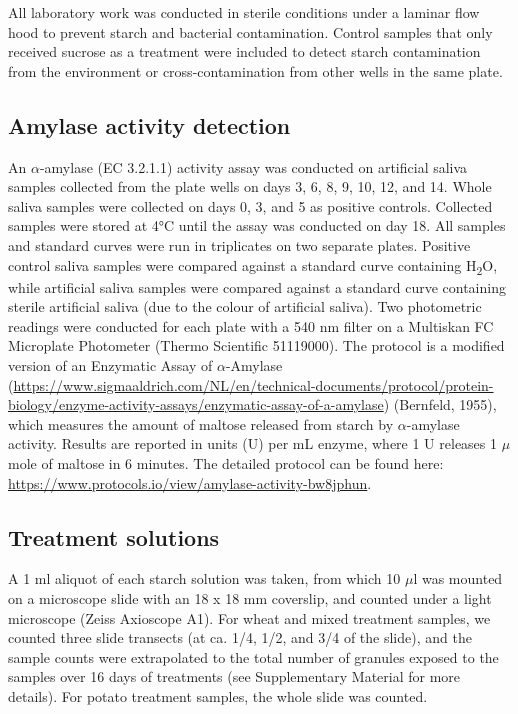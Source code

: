 \documentclass[utf8]{frontiers/frontiersSCNS}
\begin{document}
All laboratory work was conducted in sterile conditions under a laminar flow hood
to prevent starch and bacterial contamination. Control samples that only received
sucrose as a treatment were included to detect starch contamination from the
environment or cross-contamination from other wells in the same plate.

\hypertarget{amylase-activity-detection}{%
\subsection{Amylase activity detection}\label{amylase-activity-detection}}

An \(\alpha\)-amylase (EC 3.2.1.1) activity assay was conducted on artificial
saliva samples collected from the plate wells on days 3, 6, 8, 9, 10, 12, and 14.
Whole saliva samples were collected on days 0, 3, and 5 as positive controls.
Collected samples were stored at 4°C until the assay was conducted on day 18.
All samples and standard curves were run in triplicates on two separate plates.
Positive control saliva samples were compared against a standard curve containing
H\textsubscript{2}O, while artificial saliva samples were compared against a standard curve
containing sterile artificial saliva (due to the colour of artificial saliva).
Two photometric readings were conducted for each plate with a 540 nm filter on a
Multiskan FC Microplate Photometer (Thermo Scientific 51119000).
The protocol is a modified version of an Enzymatic Assay of \(\alpha\)-Amylase
(\url{https://www.sigmaaldrich.com/NL/en/technical-documents/protocol/protein-biology/enzyme-activity-assays/enzymatic-assay-of-a-amylase}) (Bernfeld, 1955), which measures the amount of
maltose released from starch by \(\alpha\)-amylase activity. Results are reported
in units (U) per mL enzyme, where 1 U releases 1 \(\mu\)mole of maltose in 6 minutes.
The detailed protocol can be found here: \url{https://www.protocols.io/view/amylase-activity-bw8jphun}.

\hypertarget{treatment-solutions}{%
\subsection{Treatment solutions}\label{treatment-solutions}}

A 1 ml aliquot of each starch solution was taken, from which 10 \(\mu\)l was mounted
on a microscope slide with an 18 x 18 mm coverslip, and counted under a light microscope
(Zeiss Axioscope A1). For wheat and mixed treatment samples, we counted three
slide transects (at ca. 1/4, 1/2, and 3/4 of the slide), and the sample counts
were extrapolated to the total number of granules exposed to the samples over 16
days of treatments (see Supplementary Material for more details). For potato
treatment samples, the whole slide was counted.
\end{document}
